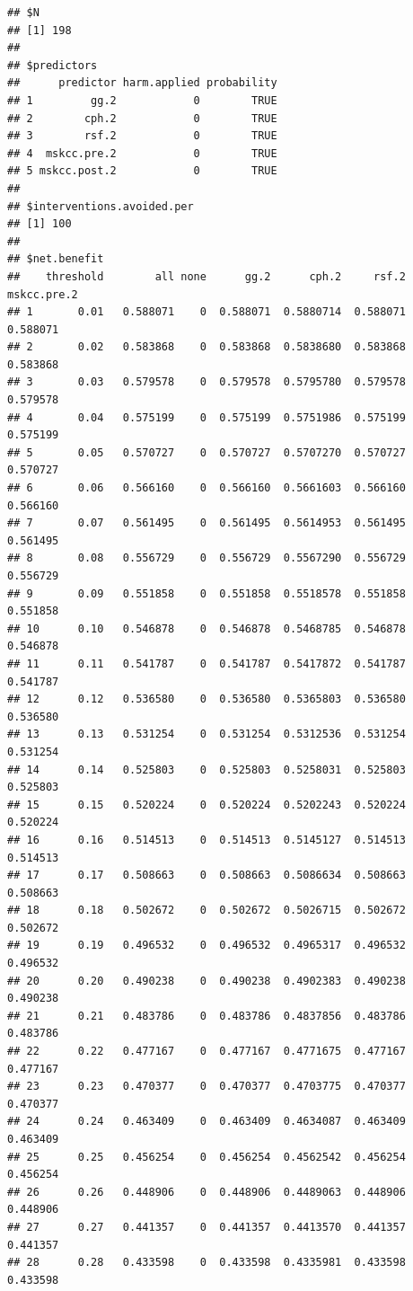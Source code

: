\documentclass{article}\usepackage[]{graphicx}\usepackage[]{color}
\makeatletter
\newenvironment{kframe}{%
 \def\at@end@of@kframe{}%
 \ifinner\ifhmode%
  \def\at@end@of@kframe{\end{minipage}}%
  \begin{minipage}{\columnwidth}%
 \fi\fi%
 \def\FrameCommand##1{\hskip\@totalleftmargin \hskip-\fboxsep
 \colorbox{shadecolor}{##1}\hskip-\fboxsep
     \hskip-\linewidth \hskip-\@totalleftmargin \hskip\columnwidth}%
 \MakeFramed {\advance\hsize-\width
   \@totalleftmargin\z@ \linewidth\hsize
   \@setminipage}}%
 {\par\unskip\endMakeFramed%
 \at@end@of@kframe}
\newenvironment{knitrout}{}{} %
\makeatother
\begin{document}
\begin{knitrout}
\begin{kframe}\begin{verbatim}
## $N
## [1] 198
## 
## $predictors
##      predictor harm.applied probability
## 1         gg.2            0        TRUE
## 2        cph.2            0        TRUE
## 3        rsf.2            0        TRUE
## 4  mskcc.pre.2            0        TRUE
## 5 mskcc.post.2            0        TRUE
## 
## $interventions.avoided.per
## [1] 100
## 
## $net.benefit
##    threshold        all none      gg.2      cph.2     rsf.2 mskcc.pre.2
## 1       0.01   0.588071    0  0.588071  0.5880714  0.588071    0.588071
## 2       0.02   0.583868    0  0.583868  0.5838680  0.583868    0.583868
## 3       0.03   0.579578    0  0.579578  0.5795780  0.579578    0.579578
## 4       0.04   0.575199    0  0.575199  0.5751986  0.575199    0.575199
## 5       0.05   0.570727    0  0.570727  0.5707270  0.570727    0.570727
## 6       0.06   0.566160    0  0.566160  0.5661603  0.566160    0.566160
## 7       0.07   0.561495    0  0.561495  0.5614953  0.561495    0.561495
## 8       0.08   0.556729    0  0.556729  0.5567290  0.556729    0.556729
## 9       0.09   0.551858    0  0.551858  0.5518578  0.551858    0.551858
## 10      0.10   0.546878    0  0.546878  0.5468785  0.546878    0.546878
## 11      0.11   0.541787    0  0.541787  0.5417872  0.541787    0.541787
## 12      0.12   0.536580    0  0.536580  0.5365803  0.536580    0.536580
## 13      0.13   0.531254    0  0.531254  0.5312536  0.531254    0.531254
## 14      0.14   0.525803    0  0.525803  0.5258031  0.525803    0.525803
## 15      0.15   0.520224    0  0.520224  0.5202243  0.520224    0.520224
## 16      0.16   0.514513    0  0.514513  0.5145127  0.514513    0.514513
## 17      0.17   0.508663    0  0.508663  0.5086634  0.508663    0.508663
## 18      0.18   0.502672    0  0.502672  0.5026715  0.502672    0.502672
## 19      0.19   0.496532    0  0.496532  0.4965317  0.496532    0.496532
## 20      0.20   0.490238    0  0.490238  0.4902383  0.490238    0.490238
## 21      0.21   0.483786    0  0.483786  0.4837856  0.483786    0.483786
## 22      0.22   0.477167    0  0.477167  0.4771675  0.477167    0.477167
## 23      0.23   0.470377    0  0.470377  0.4703775  0.470377    0.470377
## 24      0.24   0.463409    0  0.463409  0.4634087  0.463409    0.463409
## 25      0.25   0.456254    0  0.456254  0.4562542  0.456254    0.456254
## 26      0.26   0.448906    0  0.448906  0.4489063  0.448906    0.448906
## 27      0.27   0.441357    0  0.441357  0.4413570  0.441357    0.441357
## 28      0.28   0.433598    0  0.433598  0.4335981  0.433598    0.433598

\end{verbatim}
\end{kframe}
\end{knitrout}
\end{document}
